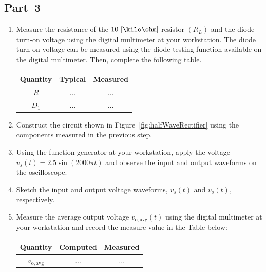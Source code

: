 \subsection{Part~3}
\label{sec:part3}
\begin{enumerate}

 
\item Measure the resistance of the $10~[\kilo\ohm]$ resistor $(R_L)$ and the diode turn-on voltage using the digital multimeter at your workstation. The diode turn-on voltage can be measured using the diode testing function available on the digital multimeter. Then, complete the following table.

  \begin{center}
    \begin{tabular}{c|c|c}
      \toprule
      Quantity &  Typical & Measured\\
      \toprule
      $R$ & $\ldots$ & $\ldots$\\   %
      $D_1$ & $\ldots$ & $\ldots$\\   %
      \bottomrule
    \end{tabular}    
  \end{center}
  
\item Construct the circuit shown in Figure~\ref{fig:halfWaveRectifier} using the components measured in the previous step. 

\item  Using the function generator at your workstation, apply the voltage $v_s(t) = 2.5\sin(2000\pi t)$ and observe the input and output waveforms on the oscilloscope.

  \item Sketch the input and output voltage waveforms, $v_s(t)$ and $v_o(t),$ respectively. 
  \begin{center}
  \end{center}
  
\item Measure the average output voltage $v_{\mathrm{o,avg}}(t)$ using the digital multimeter at your workstation and record the measure value in the Table below:
  \begin{center}
    \begin{tabular}{c|c|c}
      \toprule
      Quantity &  Computed & Measured\\
      \toprule
      $v_{\mathrm{o,avg}}$ & $\ldots$ & $\ldots$\\
      \bottomrule
    \end{tabular}    
  \end{center}
   
\end{enumerate}


